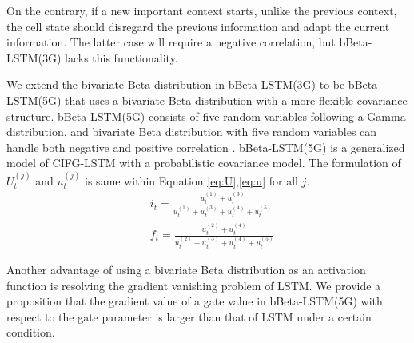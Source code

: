 \documentclass[letterpaper]{article} %
\begin{document}
On the contrary, if a new important context starts, unlike the previous context, the cell state should disregard the previous information and adapt the current information. The latter case will require a negative correlation, but bBeta-LSTM(3G) lacks this functionality.

We extend the bivariate Beta distribution in bBeta-LSTM(3G) to be bBeta-LSTM(5G) that uses a bivariate Beta distribution with a more flexible covariance structure. bBeta-LSTM(5G) consists of five random variables following a Gamma distribution, and bivariate Beta distribution with five random variables can handle both negative and positive correlation \cite{ARNOLD20111194}. bBeta-LSTM(5G) is a generalized model of CIFG-LSTM with a probabilistic covariance model. The formulation of $U_{t}^{(j)}$ and $u_{t}^{(j)}$ is same within Equation \ref{eq:U},\ref{eq:u} for all $j$.
\begin{align}
	&i_{t} = \frac{u_{t}^{(1)}+u_{t}^{(3)}}{u_{t}^{(1)}+u_{t}^{(3)}+u_{t}^{(4)}+u_{t}^{(5)}} \label{eq:5G_input} \\
	&f_{t} = \frac{u_{t}^{(2)}+u_{t}^{(4)}}{u_{t}^{(2)}+u_{t}^{(3)}+u_{t}^{(4)}+u_{t}^{(5)}} \label{eq:5G_forget}
\end{align}

Another advantage of using a bivariate Beta distribution as an activation function is resolving the gradient vanishing problem of LSTM. We provide a proposition that the gradient value of a gate value in bBeta-LSTM(5G) with respect to the gate parameter is larger than that of LSTM under a certain condition.
\end{document}
